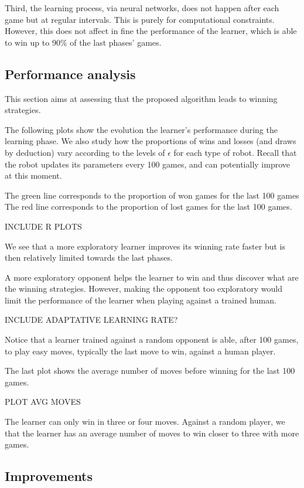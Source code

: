 \documentclass[letterpaper, 10.5 pt, conference]{ieeeconf}
\begin{document}
Third, the learning process, via neural networks, does not happen after each game but at regular intervals. This is purely for computational constraints. However, this does not affect in fine the performance of the learner, which is able to win up to 90\% of the last phases' games.

\subsection{Performance analysis}

This section aims at assessing that the proposed algorithm leads to winning strategies.

The following plots show the evolution the learner's performance during the learning phase. We also study how the proportions of wins and losses (and draws by deduction) vary according to the levels of $\epsilon$ for each type of robot. Recall that the robot updates its parameters every 100 games, and can potentially improve at this moment. 

The green line corresponds to the proportion of won games for the last 100 games The red line corresponds to the proportion of lost games for the last 100 games.

INCLUDE R PLOTS

We see that a more exploratory learner improves its winning rate faster but is then relatively limited towards the last phases.

A more exploratory opponent helps the learner to win and thus discover what are the winning strategies. However, making the opponent too exploratory would limit the performance of the learner when playing against a trained human.

INCLUDE ADAPTATIVE LEARNING RATE?

Notice that a learner trained against a random opponent is able, after 100 games, to play easy moves, typically the last move to win, against a human player.

The last plot shows the average number of moves before winning for the last 100 games. 

PLOT AVG MOVES

The learner can only win in three or four moves. Against a random player, we that the learner has an average number of moves to win closer to three with more games.

\subsection{Improvements}
\end{document}
